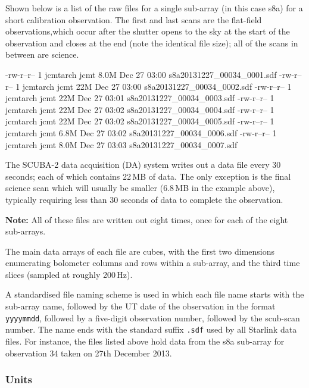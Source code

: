 Shown below is a list of the raw files for a single sub-array (in this
case s8a) for a short calibration observation. The first and last
scans are the flat-field observations,which occur after the shutter
opens to the sky at the start of the observation and closes at the end
(note the identical file size); all of the scans in between are
science.


\begin{terminalv}
\end{terminalv}

\begin{terminalv}
-rw-r--r-- 1 jcmtarch jcmt 8.0M Dec 27 03:00 s8a20131227_00034_0001.sdf
-rw-r--r-- 1 jcmtarch jcmt  22M Dec 27 03:00 s8a20131227_00034_0002.sdf
-rw-r--r-- 1 jcmtarch jcmt  22M Dec 27 03:01 s8a20131227_00034_0003.sdf
-rw-r--r-- 1 jcmtarch jcmt  22M Dec 27 03:02 s8a20131227_00034_0004.sdf
-rw-r--r-- 1 jcmtarch jcmt  22M Dec 27 03:02 s8a20131227_00034_0005.sdf
-rw-r--r-- 1 jcmtarch jcmt 6.8M Dec 27 03:02 s8a20131227_00034_0006.sdf
-rw-r--r-- 1 jcmtarch jcmt 8.0M Dec 27 03:03 s8a20131227_00034_0007.sdf
\end{terminalv}

The SCUBA-2 data acquisition (DA) system writes out a data file every
30 seconds; each of which contains 22\,MB of data. The only exception
is the final science scan which will usually be smaller (6.8\,MB in
the example above), typically requiring less than 30 seconds of data
to complete the observation.

\textbf{Note:} All of these files are written out eight times, once
for each of the eight sub-arrays.

The main data arrays of each file are cubes, with the first two
dimensions enumerating bolometer columns and rows within a sub-array,
and the third time slices (sampled at roughly 200\,Hz).

A standardised file naming scheme is used in which each file name starts
with the sub-array name, followed by the UT date of the observation in
the format \texttt{yyyymmdd}, followed by a five-digit observation
number, followed by the scub-scan number. The name ends with the standard
suffix \texttt{.sdf} used by all Starlink data files. For instance, the files
listed above hold data from the s8a sub-array for observation 34 taken on
27th December 2013.

\subsubsection*{Units}

